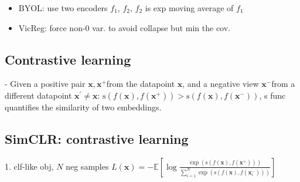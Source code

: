 


\begin{itemize}
  \item BYOL: use two encoders $f_{1}$, $f_{2}$, $f_{2}$ is exp moving average of $f_{1}$
\end{itemize}


\begin{itemize}
  \item VicReg: force non-0 var. to avoid collapse but min the cov.
\end{itemize}



\subsection*{Contrastive learning}


- Given a positive pair $\mathbf{x}, \mathbf{x}^{+}$from the datapoint $\mathbf{x}$, and a negative view $\mathbf{x}^{-}$from a different datapoint $\mathbf{x}^{\prime} \neq \mathbf{x}$:
$\mathrm{s}\left(f(\mathbf{x}), f\left(\mathbf{x}^{+}\right)\right)>\mathrm{s}\left(f(\mathbf{x}), f\left(\mathbf{x}^{-}\right)\right)$,
s func quantifies the similarity of two embeddings.

\subsection*{SimCLR: contrastive learning}

1. clf-like obj, $N$ neg samples
$
L(\mathbf{x})=-\mathbb{E}\left[\log \frac{\exp \left(\mathrm{s}\left(f(\mathbf{x}), f\left(\mathbf{x}^{+}\right)\right)\right)}{\sum_{i=1}^{N} \exp \left(\mathrm{s}\left(f(\mathbf{x}), f\left(\mathbf{x}_{i}^{-}\right)\right)\right)}\right]
$

